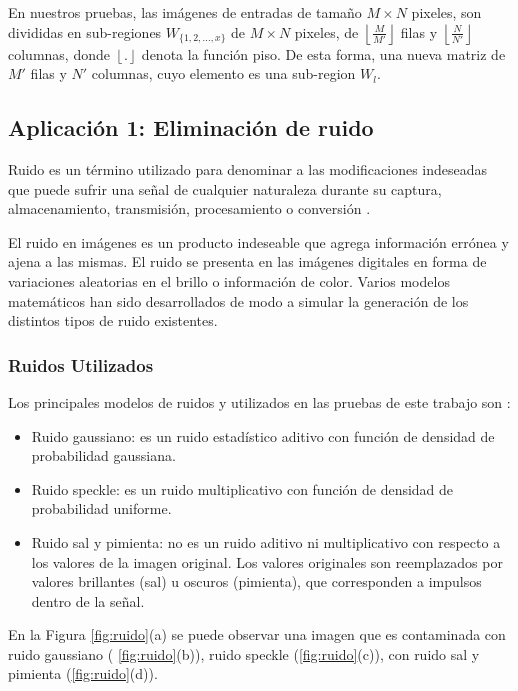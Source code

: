 En nuestros pruebas, las im\'agenes de entradas de tama\~no $M \times N$ pixeles, son divididas en sub-regiones $W_{\{1,2,...,x\}}$ de $M \times N$ pixeles, de $\left\lfloor\frac{M}{M'}\right\rfloor$ filas y $\left\lfloor\frac{N}{N'}\right\rfloor$ columnas, donde $\left\lfloor.\right\rfloor$ denota la funci\'on piso. De esta forma, una nueva matriz de $M'$ filas y $N'$ columnas, cuyo elemento es una sub-region $W_l$.



\subsection{Aplicaci\'on 1: Eliminaci\'on de ruido}
Ruido es un t\'ermino utilizado para denominar a las modificaciones indeseadas que puede sufrir una se\~nal de cualquier naturaleza durante su captura, almacenamiento, transmisi\'on, procesamiento o conversi\'on \cite{tuzlukov2002signal}.

El ruido en im\'agenes es un producto indeseable que agrega informaci\'on err\'onea y ajena a las mismas. El ruido se presenta en las im\'agenes digitales en forma de variaciones aleatorias en el brillo o informaci\'on de color. 
Varios modelos matem\'aticos han sido desarrollados de modo a simular la generaci\'on de los distintos 
tipos de ruido existentes. 
\subsubsection{Ruidos Utilizados}

Los principales modelos de ruidos y utilizados en las pruebas de este trabajo son \cite{davenport1958random}:

\begin{itemize}
	\item Ruido gaussiano: es un ruido estad\'istico aditivo con funci\'on de densidad de probabilidad gaussiana.
	\item Ruido speckle: es un ruido multiplicativo con funci\'on de densidad de probabilidad uniforme.
	\item Ruido sal y pimienta: no es un ruido aditivo ni multiplicativo con respecto a los valores de la imagen original. Los valores originales son reemplazados por valores brillantes (sal) u oscuros (pimienta), que corresponden a impulsos dentro de la se\~nal. 
\end{itemize}
En la Figura \ref{fig:ruido}(a) se puede observar una imagen que es contaminada con ruido gaussiano ( \ref{fig:ruido}(b)), ruido speckle (\ref{fig:ruido}(c)), con ruido sal y pimienta (\ref{fig:ruido}(d)). 


